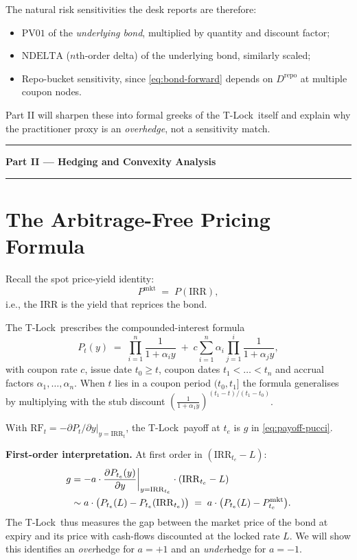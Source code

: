 \documentclass[11pt]{article}
\theoremstyle{definition}
\newcommand{\Tlock}{T-Lock}
\newcommand{\IRR}{\ensuremath{\mathrm{IRR}}}
\newcommand{\RF}{\ensuremath{\mathrm{RF}}}                 %
\newcommand{\PVone}{\ensuremath{\mathrm{PV01}}}
\newcommand{\NDELTA}{\ensuremath{\mathrm{NDELTA}}}
\newcommand{\Drepo}{D^{\mathrm{repo}}}
\begin{document}
The natural risk sensitivities the desk reports are therefore:
\begin{itemize}[leftmargin=1.4em,itemsep=2pt]
\item $\PVone$ of the \emph{underlying bond}, multiplied by quantity
      and discount factor;
\item $\NDELTA$ ($n$th-order delta) of the underlying bond, similarly
      scaled;
\item Repo-bucket sensitivity, since \cref{eq:bond-forward} depends on
      $\Drepo$ at multiple coupon nodes.
\end{itemize}
Part II will sharpen these into formal greeks of the \Tlock\ itself
and explain why the practitioner proxy is an \emph{overhedge}, not a
sensitivity match.


\bigskip\hrule\medskip
\begin{center}
\Large\bfseries Part II --- Hedging and Convexity Analysis
\end{center}
\hrule\bigskip

\section{The Arbitrage-Free Pricing Formula}\label{sec:af-price}

Recall the spot price-yield identity:
\begin{equation}
P^{\mathrm{mkt}} \;=\; P(\IRR),
\label{eq:irr-def}
\end{equation}
i.e., the $\IRR$ is the yield that reprices the bond.

The \Tlock\ prescribes the compounded-interest formula
\begin{equation}
P_t(y) \;=\; \prod_{i=1}^n \frac{1}{1+\alpha_i y}
\;+\; c \sum_{i=1}^n \alpha_i \prod_{j=1}^i \frac{1}{1+\alpha_j y},
\label{eq:bond-comp}
\end{equation}
with coupon rate $c$, issue date $t_0 \ge t$, coupon dates
$t_1<\dots<t_n$ and accrual factors $\alpha_1,\dots,\alpha_n$.
When $t$ lies in a coupon period $(t_0,t_1]$ the formula generalises by
multiplying with the stub discount $\left(\frac{1}{1+\alpha_1 y}\right)^{(t_1-t)/(t_1-t_0)}$.

With $\RF_t = -\partial P_t/\partial y\big|_{y=\IRR_t}$, the \Tlock\
payoff at $t_e$ is $g$ in \cref{eq:payoff-pucci}.

\textbf{First-order interpretation.} At first order in
$(\IRR_{t_e} - L)$:
\begin{align}
g &= -a\cdot \frac{\partial P_{t_e}(y)}{\partial y}\bigg|_{y=\IRR_{t_e}}
       \cdot (\IRR_{t_e} - L) \notag\\
  &\sim a\cdot \bigl( P_{t_e}(L) - P_{t_e}(\IRR_{t_e}) \bigr)
   \;=\; a\cdot \bigl( P_{t_e}(L) - P^{\mathrm{mkt}}_{t_e} \bigr).
\label{eq:first-order}
\end{align}
The \Tlock\ thus measures the gap between the market price of the
bond at expiry and its price with cash-flows discounted at the locked
rate $L$. We will show this identifies an \emph{over}hedge for
$a=+1$ and an \emph{under}hedge for $a=-1$.
\end{document}

